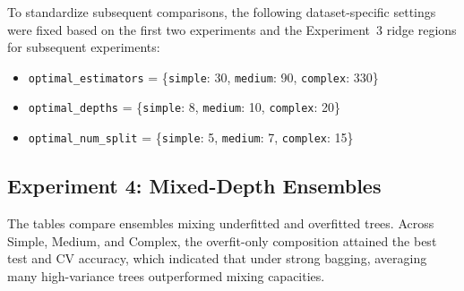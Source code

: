\documentclass[conference]{IEEEtran}
\begin{document}
To standardize subsequent comparisons, the following dataset-specific settings were fixed based on the first two experiments and the Experiment~3 ridge regions for subsequent experiments:
\begin{itemize}
  \item \texttt{optimal\_estimators} = \{\texttt{simple}: 30, \texttt{medium}: 90, \texttt{complex}: 330\}
  \item \texttt{optimal\_depths} = \{\texttt{simple}: 8, \texttt{medium}: 10, \texttt{complex}: 20\}
  \item \texttt{optimal\_num\_split} = \{\texttt{simple}: 5, \texttt{medium}: 7, \texttt{complex}: 15\}
\end{itemize}

\subsection{Experiment 4: Mixed-Depth Ensembles}
The tables compare ensembles mixing underfitted and overfitted trees. Across Simple, Medium, and Complex, the overfit-only composition attained the best test and CV accuracy, which indicated that under strong bagging, averaging many high-variance trees outperformed mixing capacities. 

\begin{table}[h]
\centering
\caption{Experiment 4 Simple Dataset: Composition versus accuracy.}
\label{tab:exp4-simple}
\end{table}
\end{document}
